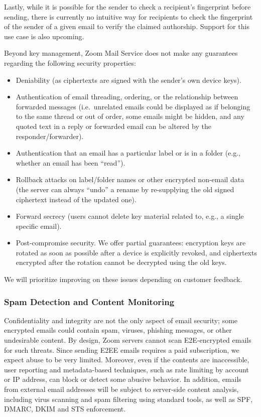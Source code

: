 Lastly, while it is possible for the sender to check a recipient's fingerprint before sending, there
is currently no intuitive way for recipients to check the fingerprint of the sender of a given email
to verify the claimed authorship. Support for this use case is also upcoming.

Beyond key management, Zoom Mail Service does not make any guarantees regarding the following
security properties:
\begin{itemize}
    \item Deniability (as ciphertexts are signed with the sender's own device keys).
    \item Authentication of email threading, ordering, or the relationship between forwarded
        messages (i.e.\ unrelated emails could be displayed as if belonging to the same thread or out
        of order, some emails might be hidden, and any quoted text in a reply or forwarded email can
        be altered by the responder/forwarder).
    \item Authentication that an email has a particular label or is in a folder (e.g., whether an
        email has been ``read'').
    \item Rollback attacks on label/folder names or other encrypted non-email data (the server can
        always ``undo'' a rename by re-supplying the old signed ciphertext instead of the updated
        one).
    \item Forward secrecy (users cannot delete key material related to, e.g., a single specific
        email).
    \item Post-compromise security. We offer partial guarantees: encryption keys are rotated as soon
        as possible after a device is explicitly revoked, and ciphertexts encrypted after the
        rotation cannot be decrypted using the old keys. 
\end{itemize}

We will prioritize improving on these issues depending on customer feedback.

\subsubsection{Spam Detection and Content Monitoring}

Confidentiality and integrity are not the only aspect of email security; some encrypted emails could
contain spam, viruses, phishing messages, or other undesirable content. By design, Zoom servers
cannot scan E2E-encrypted emails for such threats. Since sending E2EE emails requires a paid
subscription, we expect abuse to be very limited. Moreover, even if the contents are inaccessible,
user reporting and metadata-based techniques, such as rate limiting by account or IP address, can
block or detect some abusive behavior. In addition, emails from external email addresses will be
subject to server-side content analysis, including virus scanning and spam filtering using standard
tools, as well as SPF, DMARC, DKIM and STS enforcement.
